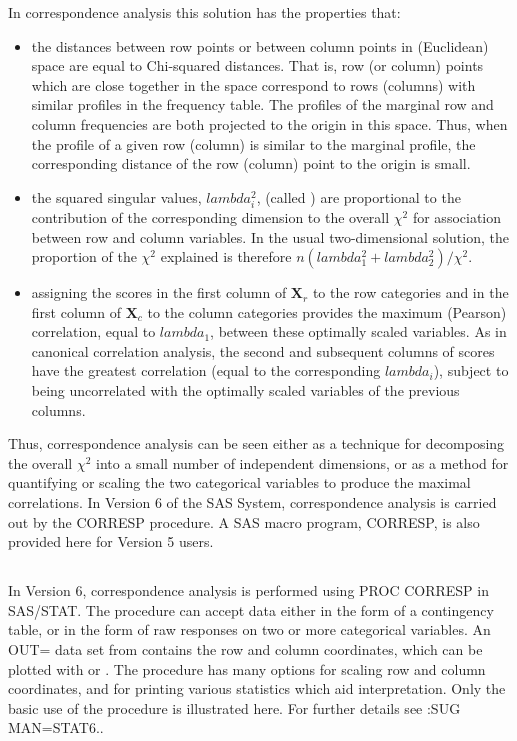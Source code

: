 In correspondence analysis this solution has the properties that:
\begin{itemize}
\item the distances between row points or between column points
in (Euclidean) space are equal to Chi-squared distances.  That is,
row (or column) points which are close together in the space correspond
to rows (columns) with similar profiles in the frequency table.
The profiles of the marginal row and column frequencies
are both projected to the origin in this space.  Thus, when the profile
of a given row (column) is similar to the marginal profile, the
corresponding distance of the row (column) point to the origin is small.
\item the squared singular values,
\(lambda_{i}^{2}\), (called )
are proportional to the contribution
of the corresponding dimension to the overall \(\chi^2\)
for association between row and column variables.
In the usual two-dimensional solution, the proportion of the
\(\chi^2\) explained is therefore
\(n ( lambda_{1}^{2} + lambda_{2}^{2} ) / \chi^2\).
\item assigning the scores in the first column of \(\mathbf{X}_{r}\)
to the row categories and in the first column of \(\mathbf{X}_{c}\)
to the column categories provides the maximum (Pearson) correlation,
equal to \(lambda_{1}\),
between these optimally scaled variables.
As in canonical correlation
analysis, the second and subsequent columns of scores have the greatest
correlation (equal to the corresponding \(lambda_{i}\)),
subject to being uncorrelated with the optimally
scaled variables of the previous columns.
\end{itemize}
Thus, correspondence analysis can be seen either as a technique for
decomposing the overall \(\chi^2\) into a small number of independent
dimensions, or as a method for quantifying or scaling the two
categorical variables to produce the maximal
correlations.
In Version 6 of the SAS System, correspondence analysis is carried out by
the CORRESP procedure.
A SAS macro program, CORRESP, is also provided here for
Version 5 users.

\subsection{}
In Version 6, correspondence analysis is performed using PROC
CORRESP in SAS/STAT.
The procedure can accept
data either in the form of a contingency
table, or in the form of raw responses on two or more
categorical variables.
An OUT= data set from  contains the row and column
coordinates, which can be plotted with  or .
The procedure has many options for scaling row and column coordinates,
and
for printing various statistics which aid interpretation.
Only the basic use of the procedure is illustrated here.
For further details see :SUG MAN=STAT6..

